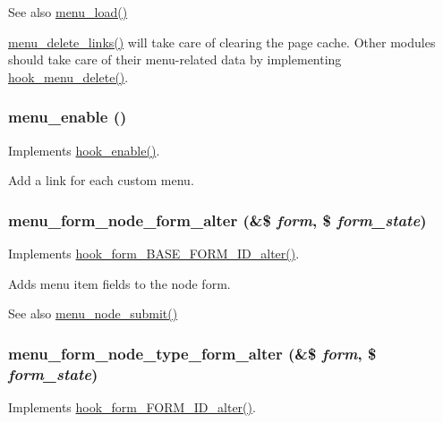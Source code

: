 \begin{DoxySeeAlso}{See also}
\hyperlink{menu_8module_afa91fb0278c163a85e7a0913d7fedb3b}{menu\_\-load()}
\end{DoxySeeAlso}
\hyperlink{group__menu_gade553e3a51918b9290425df7f775aa14}{menu\_\-delete\_\-links()} will take care of clearing the page cache. Other modules should take care of their menu-\/related data by implementing \hyperlink{group__hooks_gaef8c43d600c4efbae913dc3841a93199}{hook\_\-menu\_\-delete()}. \hypertarget{menu_8module_a053bee28fef24dd06398ab568a068aff}{
\subsubsection[{menu\_\-enable}]{\setlength{\rightskip}{0pt plus 5cm}menu\_\-enable ()}}
\label{menu_8module_a053bee28fef24dd06398ab568a068aff}
Implements \hyperlink{group__hooks_gaedcfb58c08d5c5f8ffcd1059ceeb39e4}{hook\_\-enable()}.

Add a link for each custom menu. \hypertarget{menu_8module_aca38a3b6e6e0bc466ef011a0ed9d5cec}{
\subsubsection[{menu\_\-form\_\-node\_\-form\_\-alter}]{\setlength{\rightskip}{0pt plus 5cm}menu\_\-form\_\-node\_\-form\_\-alter (\&\$ {\em form}, \/  \$ {\em form\_\-state})}}
\label{menu_8module_aca38a3b6e6e0bc466ef011a0ed9d5cec}
Implements \hyperlink{group__hooks_gaf0cfc224a88c8823da68856c30a4841a}{hook\_\-form\_\-BASE\_\-FORM\_\-ID\_\-alter()}.

Adds menu item fields to the node form.

\begin{DoxySeeAlso}{See also}
\hyperlink{menu_8module_a4654aaf42337b6e11074ab43abc66049}{menu\_\-node\_\-submit()} 
\end{DoxySeeAlso}
\hypertarget{menu_8module_a3f04aba48cd2428c9e59333ccaa963e8}{
\subsubsection[{menu\_\-form\_\-node\_\-type\_\-form\_\-alter}]{\setlength{\rightskip}{0pt plus 5cm}menu\_\-form\_\-node\_\-type\_\-form\_\-alter (\&\$ {\em form}, \/  \$ {\em form\_\-state})}}
\label{menu_8module_a3f04aba48cd2428c9e59333ccaa963e8}
Implements \hyperlink{group__hooks_ga8d4a4089551493d55911bd5c4f218264}{hook\_\-form\_\-FORM\_\-ID\_\-alter()}.

